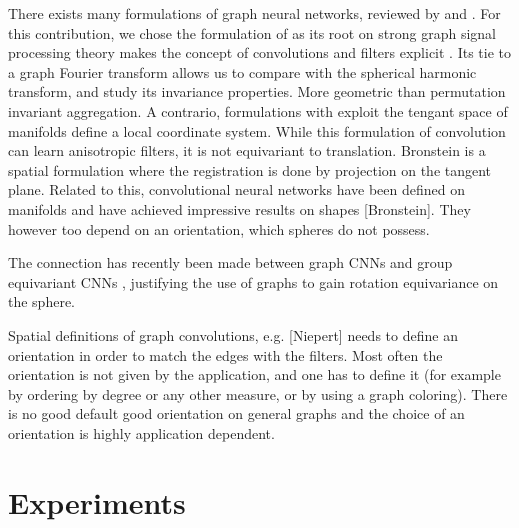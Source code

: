 \documentclass[final,twocolumn,3p,times,authoryear]{elsarticle}
\newcommand{\todo}[1]{{\color[rgb]{.6,.1,.6}{#1}}}
\newcommand{\1}{\b{1}}              %
\newcommand{\0}{\b{0}}              %
\begin{document}
There exists many formulations of graph neural networks, reviewed by \citet{bronstein2017review} and \citet{hamilton2017review}. For this contribution, we chose the formulation of \citet{defferrard2016convolutional} as its root on strong graph signal processing theory makes the concept of convolutions and filters explicit \citep{shuman2013emerging}. Its tie to a graph Fourier transform allows us to compare with the spherical harmonic transform, and study its invariance properties. More geometric than permutation invariant aggregation. A contrario, formulations with exploit the tengant space of manifolds define a local coordinate system. While this formulation of convolution can learn anisotropic filters, it is not equivariant to translation. \todo{better wording}
\todo{three main interpretations: gsp, Bronstein manifold tangent plane, message passing, permutation invariant aggregation, spatial formulations}
Bronstein is a spatial formulation where the registration is done by projection on the tangent plane.
Related to this, convolutional neural networks have been defined on manifolds and have achieved impressive results on shapes [Bronstein]. They however too depend on an orientation, which spheres do not possess.


The connection has recently been made between graph CNNs and group equivariant CNNs \cite{kondor2018equivariance}, justifying the use of graphs to gain rotation equivariance on the sphere.


Spatial definitions of graph convolutions, e.g. [Niepert] needs to define an orientation in order to match the edges with the filters. Most often the orientation is not given by the application, and one has to define it (for example by ordering by degree or any other measure, or by using a graph coloring). There is no good default good orientation on general graphs and the choice of an orientation is highly application dependent.

\section{Experiments}
\label{sec:experiments}
\end{document}
